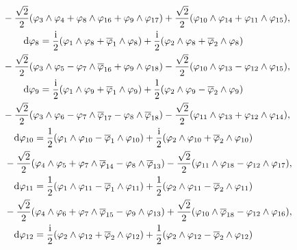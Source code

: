 \documentclass[pdftex]{sigma}
\numberwithin{equation}{section}
\begin{document}
\begin{Example}
\begin{gather*}
\hphantom{{\rm d} \varphi_{9} =}{} - \frac{\sqrt{2}}{2} (\varphi_3 \wedge \varphi_4 + \varphi_8 \wedge \varphi_{16} + \varphi_9 \wedge \varphi_{17} ) + \frac{\sqrt{2}}{2} (\varphi_{10} \wedge \varphi_{14} + \varphi_{11} \wedge \varphi_{15}),\\
{\rm d} \varphi_8 = \frac{{\rm i}}{2} (\varphi_1 \wedge \varphi_8 + \overline \varphi_1 \wedge \varphi_8) + \frac{{\rm i}}{2} (\varphi_2 \wedge \varphi_8 + \overline \varphi_2 \wedge \varphi_8)\\
\hphantom{{\rm d} \varphi_{9} =}{} - \frac{\sqrt{2}}{2} (\varphi_3 \wedge \varphi_5 - \varphi_7 \wedge \overline \varphi_{16} + \varphi_9 \wedge \varphi_{18} ) - \frac{\sqrt{2}}{2} (\varphi_{10} \wedge \varphi_{13} - \varphi_{12} \wedge \varphi_{15}),\\
{\rm d} \varphi_9 = \frac{{\rm i}}{2} (\varphi_1 \wedge \varphi_9 + \overline \varphi_1 \wedge \varphi_9) + \frac{1}{2} (\varphi_2 \wedge \varphi_9 - \overline \varphi_2 \wedge \varphi_9)\\
\hphantom{{\rm d} \varphi_{9} =}{} - \frac{\sqrt{2}}{2} (\varphi_3 \wedge \varphi_6 - \varphi_7 \wedge \overline \varphi_{17} - \varphi_8 \wedge \overline \varphi_{18} ) - \frac{\sqrt{2}}{2} (\varphi_{11} \wedge \varphi_{13} +\varphi_{12} \wedge \varphi_{14}),\\
{\rm d} \varphi_{10} = \frac{1}{2} (\varphi_1 \wedge \varphi_{10} - \overline \varphi_1 \wedge \varphi_{10}) + \frac{{\rm i}}{2} (\varphi_2 \wedge \varphi_{10} + \overline \varphi_2 \wedge \varphi_{10})\\
\hphantom{{\rm d} \varphi_{18} =}{} - \frac{\sqrt{2}}{2} (\varphi_4 \wedge \varphi_5 + \varphi_7 \wedge \overline \varphi_{14} - \varphi_8 \wedge \overline \varphi_{13} ) - \frac{\sqrt{2}}{2} (\varphi_{11} \wedge \varphi_{18} - \varphi_{12} \wedge \varphi_{17}),\\
{\rm d} \varphi_{11} = \frac{1}{2} (\varphi_1 \wedge \varphi_{11} - \overline \varphi_1 \wedge \varphi_{11}) + \frac{1}{2} (\varphi_2 \wedge \varphi_{11} - \overline \varphi_2 \wedge \varphi_{11}) \\
\hphantom{{\rm d} \varphi_{18} =}{} - \frac{\sqrt{2}}{2} (\varphi_4 \wedge \varphi_6 + \varphi_7 \wedge \overline \varphi_{15} - \varphi_9 \wedge \varphi_{13} ) + \frac{\sqrt{2}}{2} (\varphi_{10} \wedge \overline \varphi_{18} - \varphi_{12} \wedge \varphi_{16}),\\
{\rm d} \varphi_{12} = \frac{{\rm i}}{2} (\varphi_2 \wedge \varphi_{12} + \overline \varphi_2 \wedge \varphi_{12}) + \frac{1}{2} (\varphi_2 \wedge \varphi_{12} - \overline \varphi_2 \wedge \varphi_{12}) \\

\end{gather*}
\end{Example}
\end{document}
